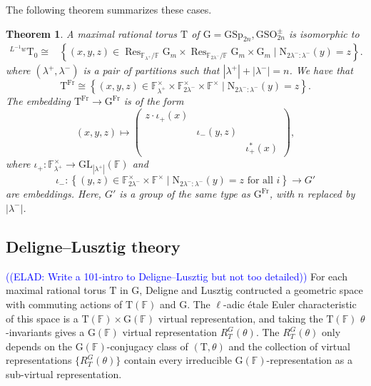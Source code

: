 \documentclass[12pt, reqno]{amsart}
\newtheorem{theorem}{Theorem}[section]
\theoremstyle{definition}
\theoremstyle{definition}
\theoremstyle{definition}
\newcommand{\multiplicativegroup}[1]{#1^{\times}}
\newcommand{\sizeof}[1]{\left|#1\right|}
\newcommand{\GL}{\mathrm{GL}}
\newcommand{\GSO}{\mathrm{GSO}}
\newcommand{\GSp}{\mathrm{GSp}}
\newcommand{\FieldNorm}[2]{\mathrm{N}_{#1:#2}}
\newcommand{\finiteField}{\mathbb{F}}
\newcommand{\finiteFieldExtension}[1]{\finiteField_{#1}}
\newcommand{\Frobenius}{\operatorname{Fr}}
\newcommand{\restrictionOfScalars}[3]{\operatorname{Res}_{#1 \slash #2}{#3}}
\newcommand{\multiplcativeScheme}{\algebraicGroup{G}_m}
\newcommand{\algebraicGroup}[1]{\boldsymbol{\mathrm{#1}}}
\newcommand{\elad}[1]{\textcolor{blue}{\sffamily ((ELAD: #1))}}
\begin{document}
	The following theorem summarizes these cases.
	\begin{theorem}
	A maximal rational torus $\algebraicGroup{T}$ of $\algebraicGroup{G} =  \algebraicGroup{\GSp}_{2n}, \algebraicGroup{\GSO}_{2n}^{\pm}$ is isomorphic to \begin{align*}
				^{L^{-1}w}\algebraicGroup{T}_0 \cong& \left\{\left(x,y,z\right) \in  \restrictionOfScalars{\finiteFieldExtension{\lambda^+}}{\finiteField}{\multiplcativeScheme} \times \restrictionOfScalars{\finiteFieldExtension{2\lambda^-}}{\finiteField}{\multiplcativeScheme}  \times \multiplcativeScheme \mid \FieldNorm{2\lambda^-}{\lambda^-}(y) = z \right\}.
	\end{align*}
	where $\left(\lambda^+, \lambda^-\right)$ is a pair of partitions such that $\sizeof{\lambda^+} + \sizeof{\lambda^-} = n$. We have that $$\algebraicGroup{T}^{\Frobenius} \cong \left\{\left(x, y, z\right) \in \multiplicativegroup{\finiteFieldExtension{\lambda^+}} \times \multiplicativegroup{\finiteFieldExtension{2 \lambda^-}} \times \multiplicativegroup{\finiteField} \mid \FieldNorm{2 \lambda^{-}}{\lambda^{-}}\left(y\right) = z \right\}.$$ The embedding $\algebraicGroup{T}^{\Frobenius} \to \algebraicGroup{G}^{\Frobenius}$ is of the form $$\left(x, y, z\right) \mapsto
	\begin{pmatrix}
		z \cdot \iota_+ \left(x\right)\\
		& \iota_{-}\left(y,z\right) &\\
		& & \iota_+^{\ast}\left(x\right)
	\end{pmatrix},$$
	where $\iota_+ \colon \multiplicativegroup{\finiteFieldExtension{\lambda^+}} \to \GL_{\sizeof{\lambda^+}}\left(\finiteField\right)$ and $$\iota_- \colon \left\{ \left(y, z\right)\in \multiplicativegroup{\finiteFieldExtension{2 \lambda^-}} \times \multiplicativegroup{\finiteField} \mid \FieldNorm{2 \lambda^{-}}{\lambda^{-}}\left(y\right) = z \text{ for all } i \right\} \to G'$$ are embeddings. Here, $G'$ is a group of the same type as $\algebraicGroup{G}^{\Frobenius}$, with $n$ replaced by $\sizeof{\lambda^{-}}$.
\end{theorem}

\subsection{Deligne--Lusztig theory}
\elad{Write a 101-intro to Deligne--Lusztig but not too detailed}
For each maximal rational torus $\algebraicGroup{T}$ in $\algebraicGroup{G}$, Deligne and Lusztig contructed a geometric space with commuting actions of $\algebraicGroup{T}(\finiteField)$ and $\algebraicGroup{G}$.
The $\ell$-adic \'etale Euler characteristic of this space is a $\algebraicGroup{T}(\finiteField) \times \algebraicGroup{G}(\finiteField)$ virtual representation, and taking the $\algebraicGroup{T}(\finiteField)$ $\theta$-invariants gives a $\algebraicGroup{G}(\finiteField)$ virtual representation $R_T^G(\theta)$.
The $R_T^G(\theta)$ only depends on the $\algebraicGroup{G}(\finiteField)$-conjugacy class of $(\algebraicGroup{T},\theta)$ and
the collection of virtual representations $\{R_T^G(\theta)\}$ contain every irreducible $\algebraicGroup{G}(\finiteField)$-representation as a sub-virtual representation.
\end{document}
